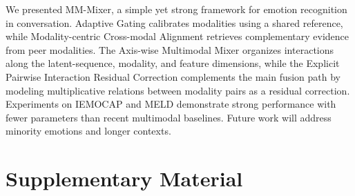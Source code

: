 \documentclass[letterpaper]{article} %
\begin{document}
We presented MM-Mixer, a simple yet strong framework for emotion
recognition in conversation. Adaptive Gating calibrates modalities
using a shared reference, while Modality-centric Cross-modal Alignment
retrieves complementary evidence from peer modalities. The Axis-wise
Multimodal Mixer organizes interactions along the latent-sequence,
modality, and feature dimensions, while the Explicit Pairwise
Interaction Residual Correction complements the main fusion path by
modeling multiplicative relations between modality pairs as a residual
correction. Experiments on IEMOCAP and MELD demonstrate strong
performance with fewer parameters than recent multimodal baselines.
Future work will address minority emotions and longer contexts.





\FloatBarrier
\appendix
\section*{Supplementary Material}



\end{document}
